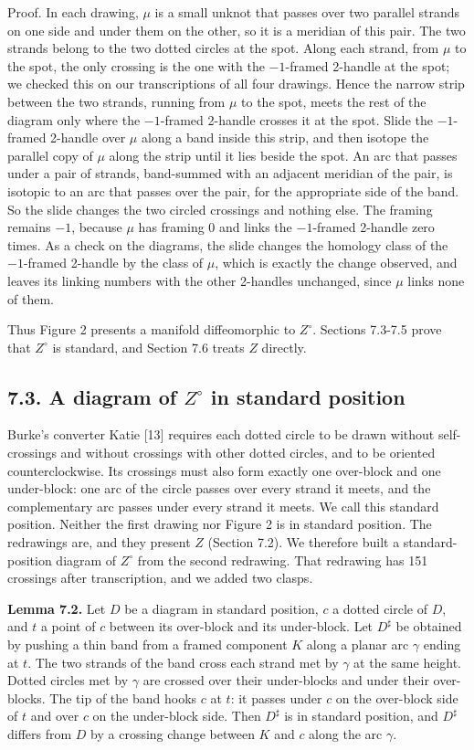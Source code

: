 \documentclass[11pt,letterpaper]{article}
\begin{document}
Proof. In each drawing, $\mu$ is a small unknot that passes over two parallel strands on one side and under them on the other, so it is a meridian of this pair. The two strands belong to the two dotted circles at the spot. Along each strand, from $\mu$ to the spot, the only crossing is the one with the $-1$-framed 2-handle at the spot; we checked this on our transcriptions of all four drawings. Hence the narrow strip between the two strands, running from $\mu$ to the spot, meets the rest of the diagram only where the $-1$-framed 2-handle crosses it at the spot. Slide the $-1$-framed 2-handle over $\mu$ along a band inside this strip, and then isotope the parallel copy of $\mu$ along the strip until it lies beside the spot. An arc that passes under a pair of strands, band-summed with an adjacent meridian of the pair, is isotopic to an arc that passes over the pair, for the appropriate side of the band. So the slide changes the two circled crossings and nothing else. The framing remains $-1$, because $\mu$ has framing $0$ and links the $-1$-framed 2-handle zero times. As a check on the diagrams, the slide changes the homology class of the $-1$-framed 2-handle by the class of $\mu$, which is exactly the change observed, and leaves its linking numbers with the other 2-handles unchanged, since $\mu$ links none of them.

Thus Figure 2 presents a manifold diffeomorphic to $Z^\circ$. Sections 7.3-7.5 prove that $Z^\circ$ is standard, and Section 7.6 treats $Z$ directly.

\subsection*{7.3. A diagram of $Z^\circ$ in standard position}
Burke's converter Katie [13] requires each dotted circle to be drawn without self-crossings and without crossings with other dotted circles, and to be oriented counterclockwise. Its crossings must also form exactly one over-block and one under-block: one arc of the circle passes over every strand it meets, and the complementary arc passes under every strand it meets. We call this standard position. Neither the first drawing nor Figure 2 is in standard position. The redrawings are, and they present $Z$ (Section 7.2). We therefore built a standard-position diagram of $Z^\circ$ from the second redrawing. That redrawing has 151 crossings after transcription, and we added two clasps.

\medskip\noindent\textbf{Lemma 7.2.} Let $D$ be a diagram in standard position, $c$ a dotted circle of $D$, and $t$ a point of $c$ between its over-block and its under-block. Let $D^\sharp$ be obtained by pushing a thin band from a framed component $K$ along a planar arc $\gamma$ ending at $t$. The two strands of the band cross each strand met by $\gamma$ at the same height. Dotted circles met by $\gamma$ are crossed over their under-blocks and under their over-blocks. The tip of the band hooks $c$ at $t$: it passes under $c$ on the over-block side of $t$ and over $c$ on the under-block side. Then $D^\sharp$ is in standard position, and $D^\sharp$ differs from $D$ by a crossing change between $K$ and $c$ along the arc $\gamma$.
\end{document}
